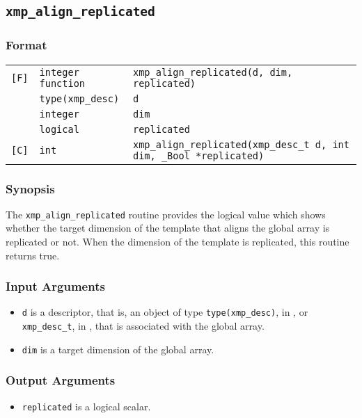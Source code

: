 \subsection{\tt xmp\_align\_replicated}

\subsubsection*{Format}

\begin{tabular}{lll}

\verb![F]!& {\tt integer function}& {\tt xmp\_align\_replicated(d, dim, replicated)}\\
          & {\tt type(xmp\_desc)} & {\tt d}\\
          & {\tt integer} & {\tt dim}\\
          & {\tt logical} & {\tt replicated}\\

\verb![C]!&  {\tt int}& {\tt xmp\_align\_replicated(xmp\_desc\_t d, int dim, \_Bool *replicated)}\\

\end{tabular}

\subsubsection*{Synopsis}

The {\tt xmp\_align\_replicated} routine provides the logical value which shows whether the target dimension of the template that aligns the global array is replicated or not.
  When the dimension of the template is replicated, this routine returns true.


\subsubsection*{Input Arguments}
\begin{itemize}
 \item {\tt d} is a descriptor, that is, an object of type 
       {\tt type(xmp\_desc)}, in {\XMPF}, or {\tt xmp\_desc\_t},
       in {\XMPC}, that is associated with the global array.
 \item {\tt dim} is a target dimension of the global array.
\end{itemize}

\subsubsection*{Output Arguments}
\begin{itemize}
 \item {\tt replicated} is a logical scalar.
\end{itemize}


